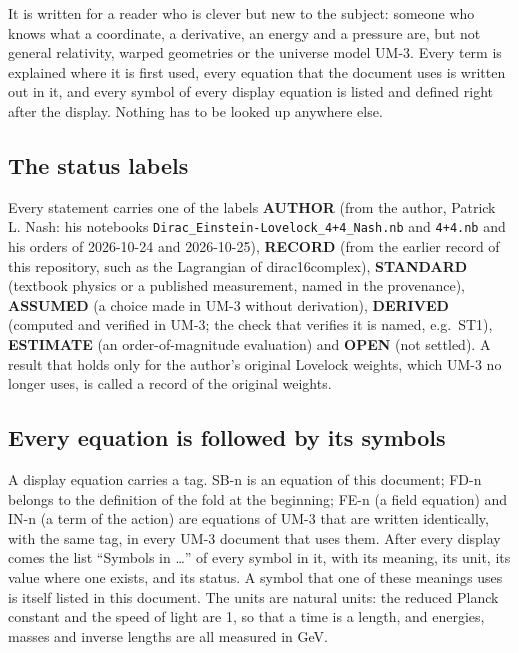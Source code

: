 \documentclass[
  10pt,
]{article}
\begin{document}
It is written for a reader who is clever but new to the subject: someone
who knows what a coordinate, a derivative, an energy and a pressure are,
but not general relativity, warped geometries or the universe model
UM-3. Every term is explained where it is first used, every equation
that the document uses is written out in it, and every symbol of every
display equation is listed and defined right after the display. Nothing
has to be looked up anywhere else.

\hypertarget{the-status-labels}{%
\subsection{The status labels}\label{the-status-labels}}

Every statement carries one of the labels \textbf{AUTHOR} (from the
author, Patrick L. Nash: his notebooks
\texttt{Dirac\_Einstein-Lovelock\_4+4\_Nash.nb} and \texttt{4+4.nb} and
his orders of 2026-10-24 and 2026-10-25), \textbf{RECORD} (from the
earlier record of this repository, such as the Lagrangian of
dirac16complex), \textbf{STANDARD} (textbook physics or a published
measurement, named in the provenance), \textbf{ASSUMED} (a choice made
in UM-3 without derivation), \textbf{DERIVED} (computed and verified in
UM-3; the check that verifies it is named, e.g.~ST1), \textbf{ESTIMATE}
(an order-of-magnitude evaluation) and \textbf{OPEN} (not settled). A
result that holds only for the author's original Lovelock weights, which
UM-3 no longer uses, is called a record of the original weights.

\hypertarget{every-equation-is-followed-by-its-symbols}{%
\subsection{Every equation is followed by its
symbols}\label{every-equation-is-followed-by-its-symbols}}

A display equation carries a tag. SB-n is an equation of this document;
FD-n belongs to the definition of the fold at the beginning; FE-n (a
field equation) and IN-n (a term of the action) are equations of UM-3
that are written identically, with the same tag, in every UM-3 document
that uses them. After every display comes the list ``Symbols in
\ldots{}'' of every symbol in it, with its meaning, its unit, its value
where one exists, and its status. A symbol that one of these meanings
uses is itself listed in this document. The units are natural units: the
reduced Planck constant and the speed of light are 1, so that a time is
a length, and energies, masses and inverse lengths are all measured in
GeV.
\end{document}
